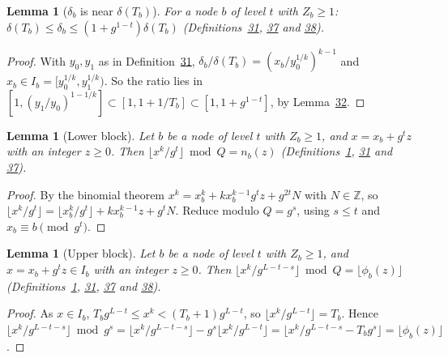 \documentclass[11pt]{article}
\newcounter{hffc}
\theoremstyle{definition}\newtheorem{hffdef}[hffc]{Definition}
\theoremstyle{plain}\newtheorem{hfflem}[hffc]{Lemma}\newtheorem{hffthm}[hffc]{Theorem}
\theoremstyle{remark}\newtheorem{hffrem}[hffc]{Remark}
\newcommand{\hffcost}{}
\newcommand{\setcost}[1]{\renewcommand{\hffcost}{#1}}
\newcommand{\Z}{\mathbb{Z}}\newcommand{\R}{\mathbb{R}}\newcommand{\N}{\mathbb{N}}
\begin{document}
\begin{hfflem}[$\delta_b$ is near $\delta(T_b)$]\label{L:deltab}
For a node $b$ of level $t$ with $Z_b\ge1$: $\delta(T_b)\le\delta_b\le(1+g^{1-t})\delta(T_b)$ (Definitions~\hyperref[D:node]{31}, \hyperref[D:phase]{37} and \hyperref[D:arch]{38}).
\par\nopagebreak{}
\end{hfflem}
\begin{proof}\setcost{length 136/300}With $y_0,y_1$ as in Definition~\hyperref[D:node]{31}, $\delta_b/\delta(T_b)=(x_b/y_0^{1/k})^{k-1}$ and $x_b\in I_b=[y_0^{1/k},y_1^{1/k})$. So the ratio lies in $[1,(y_1/y_0)^{1-1/k}]\subset[1,1+1/T_b]\subset[1,1+g^{1-t}]$, by Lemma~\hyperref[L:lead]{32}.
\end{proof}

\begin{hfflem}[Lower block]\label{L:low}
Let $b$ be a node of level $t$ with $Z_b\ge1$, and $x=x_b+g^tz$ with an integer $z\ge0$. Then $\lfloor x^k/g^t\rfloor\bmod Q=n_b(z)$ (Definitions~\hyperref[D:conv]{1}, \hyperref[D:node]{31} and \hyperref[D:phase]{37}).
\par\nopagebreak{}
\end{hfflem}
\begin{proof}\setcost{length 120/300}By the binomial theorem $x^k=x_b^k+kx_b^{k-1}g^tz+g^{2t}N$ with $N\in\Z$, so $\lfloor x^k/g^t\rfloor=\lfloor x_b^k/g^t\rfloor+kx_b^{k-1}z+g^tN$. Reduce modulo $Q=g^s$, using $s\le t$ and $x_b\equiv b\pmod{g^t}$.
\end{proof}

\begin{hfflem}[Upper block]\label{L:up}
Let $b$ be a node of level $t$ with $Z_b\ge1$, and $x=x_b+g^tz\in I_b$ with an integer $z\ge0$. Then $\lfloor x^k/g^{L-t-s}\rfloor\bmod Q=\lfloor\phi_b(z)\rfloor$ (Definitions~\hyperref[D:conv]{1}, \hyperref[D:node]{31}, \hyperref[D:phase]{37} and \hyperref[D:arch]{38}).
\par\nopagebreak{}
\end{hfflem}
\begin{proof}\setcost{length 114/300}As $x\in I_b$, $T_bg^{L-t}\le x^k<(T_b+1)g^{L-t}$, so $\lfloor x^k/g^{L-t}\rfloor=T_b$. Hence $\lfloor x^k/g^{L-t-s}\rfloor\bmod g^s=\lfloor x^k/g^{L-t-s}\rfloor-g^s\lfloor x^k/g^{L-t}\rfloor =\lfloor x^k/g^{L-t-s}-T_bg^s\rfloor=\lfloor\phi_b(z)\rfloor$.
\end{proof}
\end{document}
